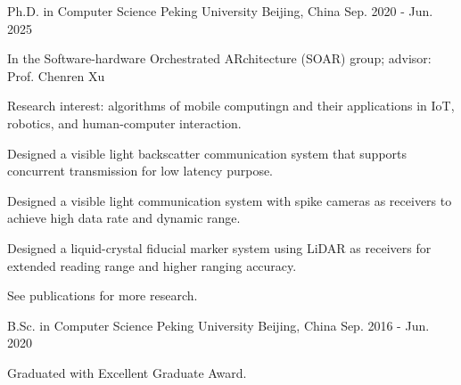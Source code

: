 \documentclass[11pt, a4paper]{awesome-cv}
\begin{document}
\begin{cventries}
\end{cventries}


\begin{cventries}
	
	\cventry
	{Ph.D. in Computer Science}
	{Peking University}
	{Beijing, China}
	{Sep. 2020 - Jun. 2025}
	{
		\begin{cvitems} %
			\item {In the Software-hardware Orchestrated ARchitecture (SOAR) group; advisor: Prof. Chenren Xu}
			\item {Research interest: algorithms of mobile computingn and their applications in IoT, robotics, and human-computer interaction.}
			\item {Designed a visible light backscatter communication system that supports concurrent transmission for low latency purpose.}
			\item {Designed a visible light communication system with spike cameras as receivers to achieve high data rate and dynamic range.}
			\item {Designed a liquid-crystal fiducial marker system using LiDAR as receivers for extended reading range and higher ranging accuracy.}
			\item {See publications for more research.}
		\end{cvitems}
	}

	\cventry
	{B.Sc. in Computer Science} %
	{Peking University} %
	{Beijing, China} %
	{Sep. 2016 - Jun. 2020} %
	{
		\begin{cvitems} %
			\item {Graduated with Excellent Graduate Award.}
		\end{cvitems}
	}

\end{cventries}
\end{document}
